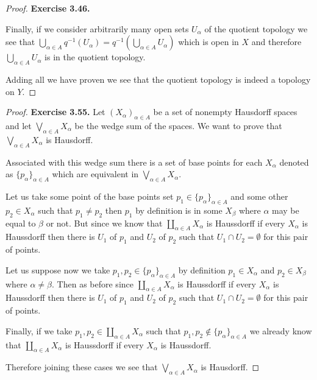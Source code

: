 \documentclass[11pt]{article}
\theoremstyle{definition}
\begin{document}
\begin{proof}{\textbf{Exercise 3.46.}}
\begin{itemize}
        Finally, if we consider arbitrarily many open sets $U_\alpha$ of
        the quotient topology we see that
        $\bigcup_{\alpha \in A} q^{-1}(U_\alpha)
        = q^{-1}(\bigcup_{\alpha \in A} U_\alpha)$
        which is open in $X$ and therefore $\bigcup_{\alpha \in A} U_\alpha$
        is in the quotient topology.
    \end{itemize}
    Adding all we have proven we see that the quotient topology is indeed
    a topology on $Y$.
\end{proof}
\cleardoublepage
\begin{proof}{\textbf{Exercise 3.55.}}
    Let $(X_\alpha)_{\alpha \in A}$ be a set of nonempty Hausdorff spaces
    and let $\bigvee_{\alpha \in A} X_\alpha$ be the wedge sum of the spaces.
    We want to prove that $\bigvee_{\alpha \in A} X_\alpha$ is Hausdorff.

    Associated with this wedge sum there is a set of base points for each
    $X_\alpha$ denoted as $\{p_\alpha\}_{\alpha \in A}$ which are equivalent in
    $\bigvee_{\alpha \in A} X_\alpha$.

    Let us take some point of the base points set
    $p_1 \in \{p_\alpha\}_{\alpha \in A}$ and some other $p_2 \in X_\alpha$
    such that $p_1 \neq p_2$ then $p_1$ by definition is in some $X_\beta$
    where $\alpha$ may be equal to $\beta$ or not.
    But since we know that $\coprod_{\alpha \in A} X_\alpha$ is Haussdorff
    if every $X_\alpha$ is Haussdorff then there is $U_1$ of $p_1$ and $U_2$
    of $p_2$ such that $U_1 \cap U_2 = \emptyset$ for this pair of points.

    Let us suppose now we take $p_1, p_2 \in \{p_\alpha\}_{\alpha \in A}$
    by definition $p_1 \in X_\alpha$ and $p_2 \in X_\beta$
    where $\alpha \neq \beta$. Then as before since
    $\coprod_{\alpha \in A} X_\alpha$ is Haussdorff
    if every $X_\alpha$ is Haussdorff then there is $U_1$ of $p_1$ and $U_2$
    of $p_2$ such that $U_1 \cap U_2 = \emptyset$ for this pair of points.

    Finally, if we take $p_1, p_2 \in \coprod_{\alpha \in A} X_\alpha$ 
    such that $p_1, p_2 \not\in \{p_\alpha\}_{\alpha \in A}$
    we already know that $\coprod_{\alpha \in A} X_\alpha$ is Haussdorff
    if every $X_\alpha$ is Haussdorff.

    Therefore joining these cases we see that $\bigvee_{\alpha \in A} X_\alpha$
    is Hausdorff. 
\end{proof}
\end{document}
